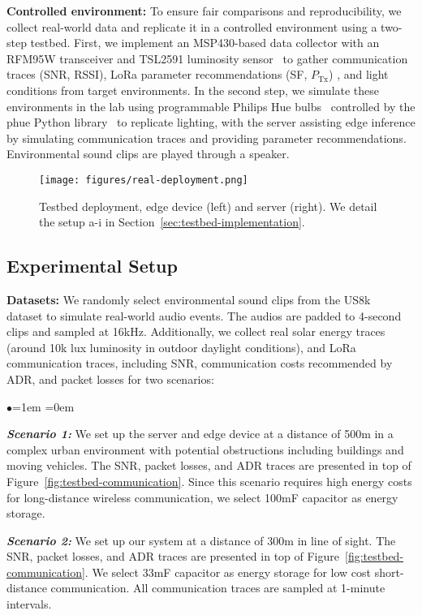 \noindent
\textbf{Controlled environment:}
To ensure fair comparisons and reproducibility, we collect real-world data and replicate it in a controlled environment using a two-step testbed. First, we implement an MSP430-based data collector with an RFM95W transceiver and TSL2591 luminosity sensor~\cite{ams2013TSL2591} to gather communication traces (SNR, RSSI), LoRa parameter recommendations (SF, $P_{\text{Tx}}$) , and light conditions from target environments. In the second step, we simulate these environments in the lab using programmable Philips Hue bulbs~\cite{lightbulb2024philips} controlled by the phue Python library~\cite{studioimaginaire2020phue} to replicate lighting, with the server assisting edge inference by simulating communication traces and providing parameter recommendations. Environmental sound clips are played through a speaker.

\begin{figure}[tp]
    \centering
    \texttt{[image: figures/real-deployment.png]}
    \vspace{-0.8cm}
    \caption{Testbed deployment, edge device (left) and server (right). We detail the setup \textcircled{\small{a}}-\textcircled{\small{i}} in Section~\ref{sec:testbed-implementation}.}
    \vspace{-0.2cm}
    \label{fig:real-deployment}
\end{figure}


\subsection{Experimental Setup}

\noindent
\textbf{Datasets:} We randomly select environmental sound clips from the US8k~\cite{salamon2017us8k} dataset to simulate real-world audio events. The audios are padded to 4-second clips and sampled at 16kHz. Additionally, we collect real solar energy traces (around 10k lux luminosity in outdoor daylight conditions), and LoRa communication traces, including SNR, communication costs recommended by ADR, and packet losses for two scenarios:
\begin{list}{$\bullet$}{\leftmargin=1em \itemindent=0em}
    \item \textbf{\textit{Scenario 1:}} We set up the server and edge device at a distance of 500m in a complex urban environment with potential obstructions including buildings and moving vehicles. The SNR, packet losses, and ADR traces are presented in top of Figure~\ref{fig:testbed-communication}. Since this scenario requires high energy costs for long-distance wireless communication, we select 100mF capacitor as energy storage.
    \item \textbf{\textit{Scenario 2:}} We set up our system at a distance of 300m in line of sight. The SNR, packet losses, and ADR traces are presented in top of Figure~\ref{fig:testbed-communication}. We select 33mF capacitor as energy storage for low cost short-distance communication. All communication traces are sampled at 1-minute intervals. 
\end{list}


